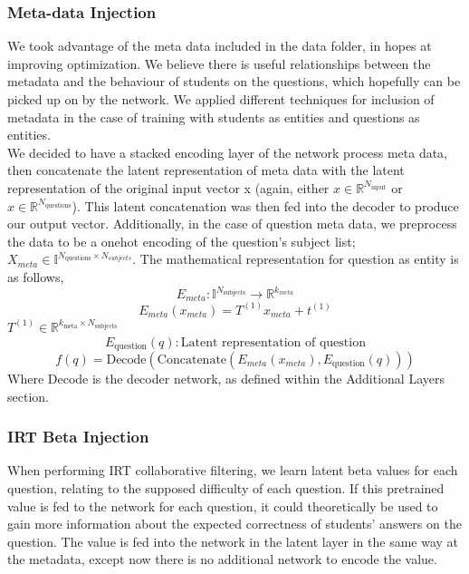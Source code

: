\documentclass{article}
\begin{document}
\subsubsection{Meta-data Injection}
We took advantage of the meta data included in the data folder, in hopes at improving optimization. We believe there is useful relationships between the metadata and the behaviour of students on the questions, which hopefully can be picked up on by the network. We applied different techniques for inclusion of metadata in the case of training with students as entities and questions as entities.\\
We decided to have a stacked encoding layer of the network process meta data, then concatenate the latent representation of meta data with the latent representation of the original input vector x (again, either $x \in \mathbb{R}^{N_{\text{input}}}$ or $x \in \mathbb{R}^{N_{\text{questions}}}$). This latent concatenation was then fed into the decoder to produce our output vector. Additionally, in the case of question meta data, we preprocess the data to be a onehot encoding of the question's subject list; $X_{meta} \in \mathbb{I}^{N_{\text{questions}}\times N_{subjects}}$. The mathematical representation for question as entity is as follows,
$$E_{meta}: \mathbb{I}^{N_{\text{subjects}}} \rightarrow \mathbb{R}^{k_{meta}}$$
$$E_{meta}(x_{meta}) = T^{(1)}x_{meta} + t^{(1)}$$
$T^{(1)} \in \mathbb{R}^{k_{\text{meta}} \times N_{\text{subjects}}}$
$$E_{\text{question}}(q): \text{Latent representation of question}$$
$$f(q) = \text{Decode}(\text{Concatenate}(E_{meta}(x_{meta}), E_{\text{question}}(q)))$$
Where Decode is the decoder network, as defined within the Additional Layers section.
\subsubsection{IRT Beta Injection}
When performing IRT collaborative filtering, we learn latent beta values for each question, relating to the supposed difficulty of each question. If this pretrained value is fed to the network for each question, it could theoretically be used to gain more information about the expected correctness of students' answers on the question. The value is fed into the network in the latent layer in the same way at the metadata, except now there is no additional network to encode the value.
\end{document}
